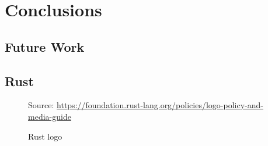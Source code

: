 \chapter{Conclusions}
\label{cha:conclusions}

\section{Future Work}
\label{sec:conclusions_future_work}

\section{Rust}
\label{sec:conclusions_rust}

\begin{figure} %
  \centering
  \def\stackalignment{r} %
  {\scriptsize \parbox[t]{\linewidth}{ Source: \url{https://foundation.rust-lang.org/policies/logo-policy-and-media-guide}} }
  \caption{Rust logo}
\end{figure}